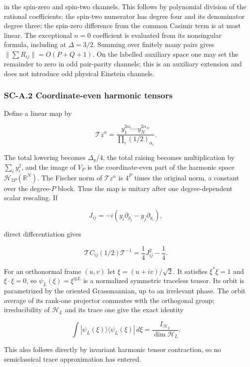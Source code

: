 \documentclass[a4paper,11pt]{article}
\numberwithin{equation}{section}
\begin{document}
in the spin-zero and spin-two channels. This follows by polynomial division of the rational coefficients: the spin-two numerator has degree four and its denominator degree three; the spin-zero difference from the common Casimir term is at most linear. The exceptional \(n=0\) coefficient is evaluated from its nonsingular formula, including at \(\Delta=3/2\). Summing over finitely many pairs gives \(\|\sum R_{ij}\|=O(P+Q+1)\). On the labelled auxiliary space one may set the remainder to zero in odd pair-parity channels; this is an auxiliary extension and does not introduce odd physical Einstein channels.

\hypertarget{sc-a.2-coordinate-even-harmonic-tensors}{%
\subsubsection{SC-A.2 Coordinate-even harmonic tensors}\label{sc-a.2-coordinate-even-harmonic-tensors}}

Define a linear map by

\[
\mathcal T z^\alpha=\frac{y_1^{2\alpha_1}\cdots y_N^{2\alpha_N}}
{\prod_i(1/2)_{\alpha_i}}.
\]

The total lowering becomes \(\Delta_y/4\), the total raising becomes multiplication by \(\sum_i y_i^2\), and the image of \(V_P\) is the coordinate-even part of the harmonic space \(\mathcal H_{2P}(\mathbb R^N)\). The Fischer norm of \(\mathcal Tz^\alpha\) is \(4^P\) times the original norm, a constant over the degree-\(P\) block. Thus the map is unitary after one degree-dependent scalar rescaling. If

\[
J_{ij}=-i(y_i\partial_{y_j}-y_j\partial_{y_i}),
\]

direct differentiation gives

\[
\mathcal T C_{ij}(1/2)\mathcal T^{-1}
=\frac14J_{ij}^2-\frac14.
\]

For an orthonormal frame \((u,v)\) let \(\xi=(u+iv)/\sqrt2\). It satisfies \(\xi^*\xi=1\) and \(\xi\cdot\xi=0\), so \(\psi_L(\xi)=\xi^{\otimes L}\) is a normalized symmetric traceless tensor. Its orbit is parametrized by the oriented Grassmannian, up to an irrelevant phase. The orbit average of its rank-one projector commutes with the orthogonal group; irreducibility of \(\mathcal H_L\) and its trace one give the exact identity

\[
\int |\psi_L(\xi)\rangle\langle\psi_L(\xi)|\,d\xi
=\frac{I_{\mathcal H_L}}{\dim\mathcal H_L}.
\]

This also follows directly by invariant harmonic tensor contraction, so no semiclassical trace approximation has entered.
\end{document}
